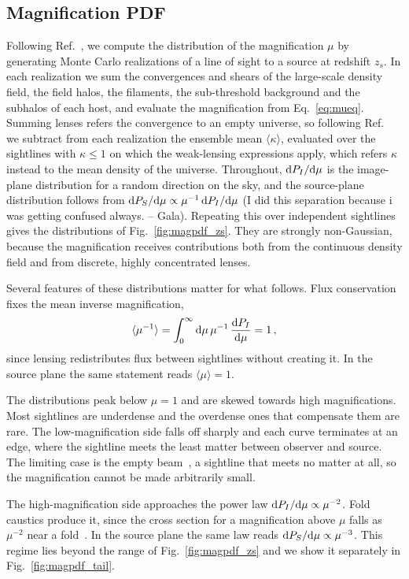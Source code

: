 \documentclass[aps,prd,10pt,nofootinbib,twocolumn,superscriptaddress,floatfix,notitlepage]{revtex4-1}
\newcommand{\td}{{\rm d}}
\newcommand{\be}{\begin{equation}}
\newcommand{\ee}{\end{equation}}
\newcommand{\Gala}[1]{{\color{orange} (#1 -- Gala)}}
\begin{document}
\subsection{Magnification PDF}
\label{sec:pdf}

Following Ref.~\cite{Vaskonen:2026ubd}, we compute the distribution of the magnification $\mu$ by generating Monte Carlo realizations of a line of sight to a source at redshift $z_s$. In each realization we sum the convergences and shears of the large-scale density field, the field halos, the filaments, the sub-threshold background and the subhalos of each host, and evaluate the magnification from Eq.~\eqref{eq:mueq}. Summing lenses refers the convergence to an empty universe, so following Ref.~\cite{Vaskonen:2026ubd} we subtract from each realization the ensemble mean $\langle\kappa\rangle$, evaluated over the sightlines with $\kappa \leq 1$ on which the weak-lensing expressions apply, which refers $\kappa$ instead to the mean density of the universe. Throughout, $\td P_I/\td\mu$ is the image-plane distribution for a random direction on the sky, and the source-plane distribution follows from $\td P_S/\td\mu \propto \mu^{-1}\,\td P_I/\td\mu$ \Gala{I did this separation because i was getting confused always.}. Repeating this over independent sightlines gives the distributions of Fig.~\ref{fig:magpdf_zs}. They are strongly non-Gaussian, because the magnification receives contributions both from the continuous density field and from discrete, highly concentrated lenses.

Several features of these distributions matter for what follows. Flux conservation~\cite{Weinberg:1976jq} fixes the mean inverse magnification,
\be \label{eq:fluxsumrule}
    \langle \mu^{-1} \rangle = \int_0^\infty \td\mu \, \mu^{-1}\, \frac{\td P_I}{\td\mu} = 1 \,,
\ee
since lensing redistributes flux between sightlines without creating it. In the source plane the same statement reads $\langle\mu\rangle = 1$.

The distributions peak below $\mu = 1$ and are skewed towards high magnifications. Most sightlines are underdense and the overdense ones that compensate them are rare. The low-magnification side falls off sharply and each curve terminates at an edge, where the sightline meets the least matter between observer and source. The limiting case is the empty beam~\cite{Dyer1972dis}, a sightline that meets no matter at all, so the magnification cannot be made arbitrarily small.

The high-magnification side approaches the power law $\td P_I/\td\mu \propto \mu^{-2}$. Fold caustics produce it, since the cross section for a magnification above $\mu$ falls as $\mu^{-2}$ near a fold~\cite{Blandford:1986zz}. In the source plane the same law reads $\td P_S/\td\mu \propto \mu^{-3}$. This regime lies beyond the range of Fig.~\ref{fig:magpdf_zs} and we show it separately in Fig.~\ref{fig:magpdf_tail}.
\end{document}
